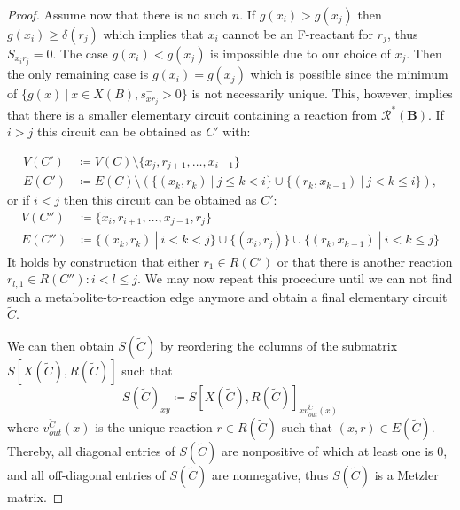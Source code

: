 \documentclass[pdflatex]{sn-jnl}
\theoremstyle{thmstyleone}%
\theoremstyle{examplesty}%
\theoremstyle{thmstylethree}%
\newcommand{\SM}{S}
\newcommand{\CR}[0]{\mathcal{R}}
\newcommand{\block}[0]{\mathbf{B}}
\newcommand{\sgen}{g}
\begin{document}
\begin{proof}
{Assume now that there is no such $n$. If $\sgen(x_i)>\sgen(x_j)$ then $\sgen(x_i)\geq \delta(r_j)$ which implies that $x_i$ cannot be an F-reactant for $r_j$, thus $S_{x_ir_j}=0$. The case
$\sgen(x_i)<\sgen(x_j)$ is impossible due to our choice of $x_j$. Then the only remaining case is $\sgen(x_i)=\sgen(x_j)$ which is possible since the minimum of $\{\sgen(x) \ \vert \ x\in X(B), s^-_{xr_j}>0\}$ is not necessarily unique. This, however, implies that there is a smaller elementary circuit containing a reaction from $\CR^*(\block)$. If $i>j$ this circuit can be obtained as $C'$ with:

	\begin{equation}
		\begin{split}
			V(C')&\coloneqq V(C)\setminus \{x_j, r_{j+1}, \ldots, x_{i-1}\}\\[0.5em]
			E(C')& \coloneqq E(C)\setminus \left(\{(x_k, r_k) \ | \ j\leq k < i\} \cup \{(r_k, x_{k-1}) \ | \ j< k \leq i\}\right),
		\end{split}
	\end{equation} 
	or if $i<j$ then this circuit can be obtained as $C'$:
	\begin{equation}
		\begin{split}
			V(C'') & \coloneqq \{x_i, r_{i+1}, \ldots, x_{j-1}, r_{j}\} \\
			E(C'') & \coloneqq\{(x_k, r_k) \ | \ i < k < j\} \cup \{(x_i,r_j)\} \cup \{(r_k, x_{k-1}) \ | \ i < k \leq j\}
		\end{split}
	\end{equation} 
	It holds by construction that either $r_1\in R(C')$ or that there is another reaction $r_{l,1} \in R(C''): i<l\leq j$. We may now repeat
	this procedure until we can not find such a metabolite-to-reaction edge anymore and obtain a final elementary circuit $\tilde{C}$.

	We can then obtain $S(\tilde{C})$ by reordering the columns of the submatrix $\SM[X(\tilde{C}), R(\tilde{C})]$ such that
	\begin{equation}
		\SM(\tilde{C})_{xy}\coloneqq \SM[X(\tilde{C}), R(\tilde{C})]_{xv^{\tilde{C}}_{out}(x)}
	\end{equation} 
	where $v^{\tilde{C}}_{out}(x)$ is the unique reaction $r\in R(\tilde{C})$ such that $(x,r)\in E(\tilde{C})$. Thereby, all diagonal entries of
	$\SM(\tilde{C})$ are nonpositive of which at least one is $0$, and all off-diagonal entries of $\SM(\tilde{C})$ are nonnegative, thus $\SM(\tilde{C})$ is a Metzler matrix.
}
\end{proof}
\end{document}
